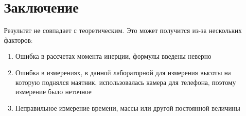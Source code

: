 \documentclass[a4paper]{article}
\begin{document}
\section{\textbf{Заключение}}
Результат не совпадает с теоретическим. Это может получится из-за нескольких факторов:
\begin{enumerate}
    \item Ошибка в рассчетах момента инерции, формулы введены неверно
    \item Ошибка в измерениях, в данной лабораторной для измерения высоты на которую поднялся маятник, использовалась камера для телефона, поэтому измерение было неточное
    \item Неправильное измерение времени, массы или другой постоянной величины
\end{enumerate}
\end{document}

